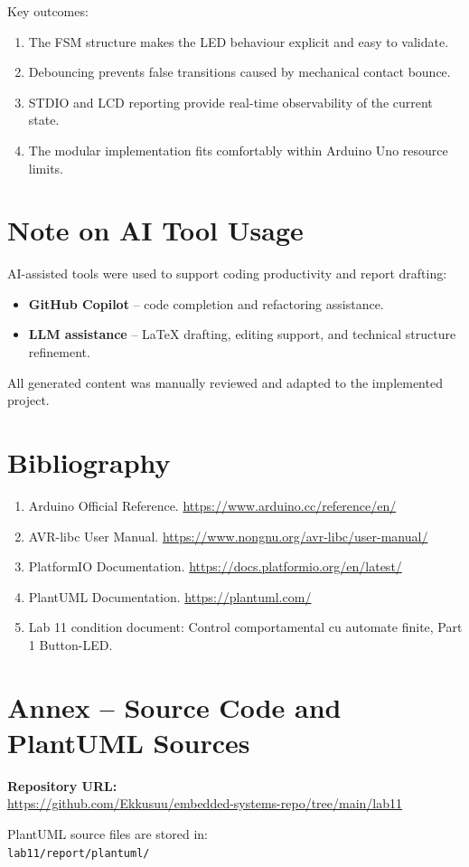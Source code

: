 \documentclass[12pt]{article}
\begin{document}
Key outcomes:
\begin{enumerate}
    \item The FSM structure makes the LED behaviour explicit and easy to validate.
    \item Debouncing prevents false transitions caused by mechanical contact bounce.
    \item STDIO and LCD reporting provide real-time observability of the current state.
    \item The modular implementation fits comfortably within Arduino Uno resource limits.
\end{enumerate}

\section*{Note on AI Tool Usage}
\hspace{0.8cm} AI-assisted tools were used to support coding productivity and report drafting:
\begin{itemize}
    \item \textbf{GitHub Copilot} -- code completion and refactoring assistance.
    \item \textbf{LLM assistance} -- LaTeX drafting, editing support, and technical structure refinement.
\end{itemize}
All generated content was manually reviewed and adapted to the implemented project.

\section*{Bibliography}
\begin{enumerate}
    \item Arduino Official Reference. \url{https://www.arduino.cc/reference/en/}
    \item AVR-libc User Manual. \url{https://www.nongnu.org/avr-libc/user-manual/}
    \item PlatformIO Documentation. \url{https://docs.platformio.org/en/latest/}
    \item PlantUML Documentation. \url{https://plantuml.com/}
    \item Lab 11 condition document: Control comportamental cu automate finite, Part 1 Button-LED.
\end{enumerate}

\FloatBarrier
\section*{Annex -- Source Code and PlantUML Sources}
\noindent\textbf{Repository URL:}\\
\url{https://github.com/Ekkusuu/embedded-systems-repo/tree/main/lab11}

\bigskip
\noindent PlantUML source files are stored in:\\
\texttt{lab11/report/plantuml/}
\end{document}
